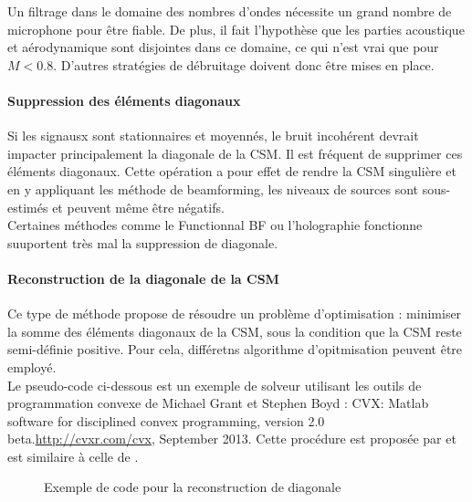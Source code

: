 Un filtrage dans le domaine des nombres d'ondes nécessite un grand nombre de microphone pour être fiable. De plus, il fait l'hypothèse que les parties acoustique et aérodynamique sont disjointes dans ce domaine, ce qui n'est vrai que pour $M<0.8$. D'autres stratégies de débruitage doivent donc être mises en place.

\paragraph{Suppression des éléments diagonaux}
Si les signausx sont stationnaires et moyennés, le bruit incohérent devrait impacter principalement la diagonale de la CSM. Il est fréquent de supprimer ces éléments diagonaux. Cette opération a pour effet de rendre la CSM singulière et en y appliquant les méthode de beamforming, les niveaux de sources sont sous-estimés et peuvent même être négatifs.\\
Certaines méthodes comme le Functionnal BF  ou l'holographie fonctionne suuportent très mal la suppression de diagonale.

\paragraph{Reconstruction de la diagonale de la CSM}
Ce type de méthode propose de résoudre un problème d'optimisation : minimiser la somme des éléments diagonaux de la CSM, sous la condition que la CSM reste semi-définie positive. Pour cela, différetns algorithme d'opitmisation peuvent être employé.\\
Le pseudo-code ci-dessous est un exemple de solveur utilisant les outils de programmation convexe de Michael Grant et Stephen Boyd : CVX: Matlab software for disciplined convex programming, version 2.0 beta.\url{http://cvxr.com/cvx}, September 2013. Cette procédure est proposée par \cite{Hald2016} et est similaire à celle de \cite{dougherty2016}.

\begin{figure}[!h]
	\centering
	\caption{Exemple de code pour la reconstruction de diagonale}
\end{figure}

